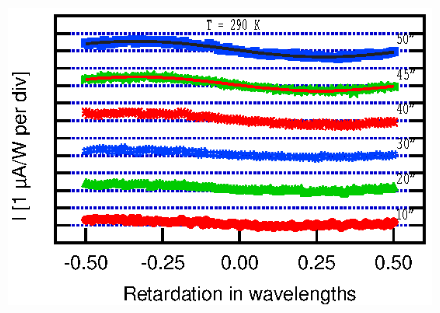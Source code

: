 \documentclass{article}
\begin{document}
 
\begin{figure}[htb]
\begin{center}
\includegraphics[scale=0.75]{fig3.eps}
\end{center}
\end{figure}
\end{document}
